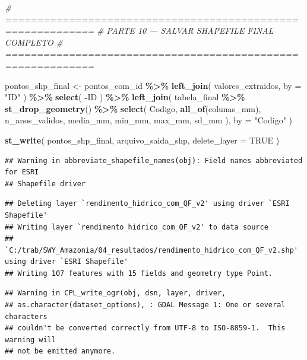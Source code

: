 \documentclass[
]{article}
\newenvironment{Shaded}{\begin{snugshade}}{\end{snugshade}}
\newcommand{\AttributeTok}[1]{\textcolor[rgb]{0.13,0.29,0.53}{#1}}
\newcommand{\CommentTok}[1]{\textcolor[rgb]{0.56,0.35,0.01}{\textit{#1}}}
\newcommand{\ConstantTok}[1]{\textcolor[rgb]{0.56,0.35,0.01}{#1}}
\newcommand{\FunctionTok}[1]{\textcolor[rgb]{0.13,0.29,0.53}{\textbf{#1}}}
\newcommand{\NormalTok}[1]{#1}
\newcommand{\OtherTok}[1]{\textcolor[rgb]{0.56,0.35,0.01}{#1}}
\newcommand{\SpecialCharTok}[1]{\textcolor[rgb]{0.81,0.36,0.00}{\textbf{#1}}}
\newcommand{\StringTok}[1]{\textcolor[rgb]{0.31,0.60,0.02}{#1}}
\begin{document}
\begin{Shaded}
\begin{Highlighting}[]
\CommentTok{\# ============================================================}
\CommentTok{\# PARTE 10 — SALVAR SHAPEFILE FINAL COMPLETO}
\CommentTok{\# ============================================================}

\NormalTok{pontos\_shp\_final }\OtherTok{\textless{}{-}}\NormalTok{ pontos\_com\_id }\SpecialCharTok{\%\textgreater{}\%}
  \FunctionTok{left\_join}\NormalTok{(}
\NormalTok{    valores\_extraidos,}
    \AttributeTok{by =} \StringTok{"ID"}
\NormalTok{  ) }\SpecialCharTok{\%\textgreater{}\%}
  \FunctionTok{select}\NormalTok{(}
    \SpecialCharTok{{-}}\NormalTok{ID}
\NormalTok{  ) }\SpecialCharTok{\%\textgreater{}\%}
  \FunctionTok{left\_join}\NormalTok{(}
\NormalTok{    tabela\_final }\SpecialCharTok{\%\textgreater{}\%}
      \FunctionTok{st\_drop\_geometry}\NormalTok{() }\SpecialCharTok{\%\textgreater{}\%}
      \FunctionTok{select}\NormalTok{(}
\NormalTok{        Codigo,}
        \FunctionTok{all\_of}\NormalTok{(colunas\_mm),}
\NormalTok{        n\_anos\_validos,}
\NormalTok{        media\_mm,}
\NormalTok{        min\_mm,}
\NormalTok{        max\_mm,}
\NormalTok{        sd\_mm}
\NormalTok{      ),}
    \AttributeTok{by =} \StringTok{"Codigo"}
\NormalTok{  )}

\FunctionTok{st\_write}\NormalTok{(}
\NormalTok{  pontos\_shp\_final,}
\NormalTok{  arquivo\_saida\_shp,}
  \AttributeTok{delete\_layer =} \ConstantTok{TRUE}
\NormalTok{)}
\end{Highlighting}
\end{Shaded}

\begin{verbatim}
## Warning in abbreviate_shapefile_names(obj): Field names abbreviated for ESRI
## Shapefile driver
\end{verbatim}

\begin{verbatim}
## Deleting layer `rendimento_hidrico_com_QF_v2' using driver `ESRI Shapefile'
## Writing layer `rendimento_hidrico_com_QF_v2' to data source 
##   `C:/trab/SWY_Amazonia/04_resultados/rendimento_hidrico_com_QF_v2.shp' using driver `ESRI Shapefile'
## Writing 107 features with 15 fields and geometry type Point.
\end{verbatim}

\begin{verbatim}
## Warning in CPL_write_ogr(obj, dsn, layer, driver,
## as.character(dataset_options), : GDAL Message 1: One or several characters
## couldn't be converted correctly from UTF-8 to ISO-8859-1.  This warning will
## not be emitted anymore.
\end{verbatim}
\end{document}
